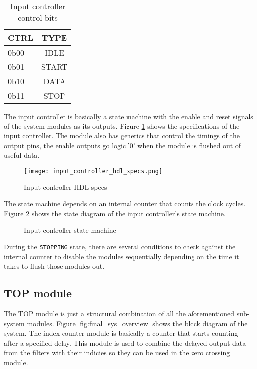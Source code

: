 \begin{table}[h]
    \centering
    \begin{tabular}{ l | c }
        CTRL & TYPE  \\
        \hline \hline
        0b00 & IDLE  \\
        0b01 & START \\
        0b10 & DATA  \\
        0b11 & STOP  \\
    \end{tabular}
    \caption{Input controller control bits}
    \label{tab:ctrl_table}
\end{table}


The input controller is basically a state machine with the enable and reset signals of the system modules as its outputs. Figure \ref{fig:input_controller_hdl_specs} shows the specifications of the input controller. The module also has generics that control the timings of the output pins, the enable outputs go logic '0' when the module is flushed out of useful data.


\begin{figure}[h]
    \centering
    \texttt{[image: input\_controller\_hdl\_specs.png]}
    \caption{Input controller HDL specs}
    \label{fig:input_controller_hdl_specs}
\end{figure}


The state machine depends on an internal counter that counts the clock cycles. Figure \ref{fig:input_controller_state_machine} shows the state diagram of the input controller's state machine.



\begin{figure}[h]
    \centering
    
    \caption{Input controller state machine}
    \label{fig:input_controller_state_machine}
\end{figure}


During the \texttt{STOPPING} state, there are several conditions to check against the internal counter to disable the modules sequentially depending on the time it takes to flush those modules out.


\subsection{TOP module}

The TOP module is just a structural combination of all the aforementioned sub-system modules. Figure \ref{fig:final_sys_overview} shows the block diagram of the system. The index counter module is basically a counter that starts counting after a specified delay. This module is used to combine the delayed output data from the filters with their indicies so they can be used in the zero crossing module.


